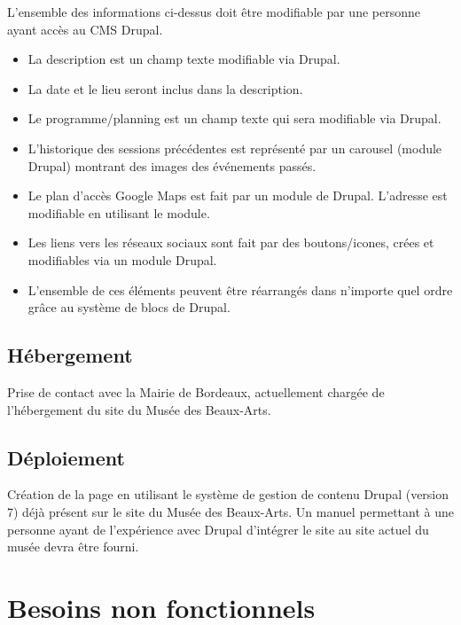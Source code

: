 \documentclass[11pt]{report}
\begin{document}
\vspace{0.5cm}

L'ensemble des informations ci-dessus doit être modifiable par une personne
ayant accès au CMS Drupal. \\

\begin{itemize}
	\item La description est un champ texte modifiable via Drupal.
	\item La date et le lieu seront inclus dans la description.
	\item Le programme/planning est un champ texte qui sera modifiable via Drupal.
	\item L'historique des sessions précédentes est représenté par un carousel
	(module Drupal) montrant des images des événements passés.
	\item Le plan d'accès Google Maps est fait par un module de Drupal.
	L'adresse est modifiable en utilisant le module.
	\item Les liens vers les réseaux sociaux sont fait par des boutons/icones,
	crées et modifiables via un module Drupal.
	\item L'ensemble de ces éléments peuvent être réarrangés dans n'importe quel ordre grâce au système de blocs de Drupal.
\end{itemize}

\subsection*{Hébergement}
Prise de contact avec la Mairie de Bordeaux, actuellement chargée de
l'hébergement du site du Musée des Beaux-Arts.

\subsection*{Déploiement}
Création de la page en utilisant le système de gestion de contenu Drupal
(version 7) déjà présent sur le site du Musée des Beaux-Arts.
Un manuel permettant à une personne ayant de l'expérience avec Drupal
d'intégrer le site au site actuel du musée devra être fourni.


\section{Besoins non fonctionnels}
\end{document}
